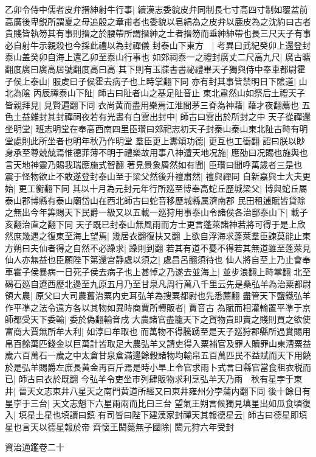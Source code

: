 乙卯令侍中儒者皮弁搢紳射牛行事|{
	續漢志委貌皮弁同制長七寸高四寸制如覆盆前高廣後卑鋭所謂夏之毋追殷之章甫者也委貌以皂絹為之皮弁以鹿皮為之沈約曰古者貴賤皆執笏其有事則搢之於腰帶所謂搢紳之士者搢笏而垂紳紳帶也長三尺天子有事必自射牛示親殺也今採此禮以為封禪儀}
封泰山下東方　|{
	考異曰武紀癸卯上還登封泰山盖癸卯自海上還乙卯至泰山行事也}
如郊祠泰一之禮封廣丈二尺高九尺|{
	廣古曠翻度廣曰廣高居號翻度高曰高}
其下則有玉牒書書祕禮畢天子獨與侍中奉車都尉霍子侯上泰山|{
	服䖍曰子侯霍去病子也上時掌翻下同}
亦有封其事皆禁明日下隂道|{
	山北為隂}
丙辰禪泰山下阯|{
	師古曰阯者山之基足阯音止}
東北肅然山如祭后土禮天子皆親拜見|{
	見賢遍翻下同}
衣尚黄而盡用樂焉江淮間茅三脊為神藉|{
	藉才夜翻薦也}
五色土益雜封其封禪祠夜若有光晝有白雲出封中|{
	師古曰雲出於所封之中}
天子從禪還坐明堂|{
	班志明堂在奉高西南四里臣瓚曰郊祀志初天子封泰山泰山東北阯古時有明堂處則此所坐者也明年秋乃作明堂}
羣臣更上夀頌功德|{
	更互也工衝翻}
詔曰朕以眇身承至尊兢兢焉惟德菲薄不明于禮樂故用事八神遭天地况施|{
	應劭曰况賜也施與也言天地神靈乃賜我瑞應施式智翻}
著見景象屑然如有聞|{
	臣瓚曰聞呼萬歲者三是也}
震于怪物欲止不敢遂登封泰山至于梁父然後升䄠肅然|{
	䄠與禪同}
自新嘉與士大夫更始|{
	更工衡翻下同}
其以十月為元封元年行所廵至博奉高蛇丘歷城梁父|{
	博與蛇丘屬泰山郡博縣有泰山廟岱山在西北師古曰蛇音移歷城縣属濟南郡}
民田租逋賦皆貸除之無出今年筭賜天下民爵一級又以五載一廵狩用事泰山令諸侯各治邸泰山下|{
	載子亥翻治直之翻下同}
天子既已封泰山無風雨而方士更言蓬萊諸神若將可得于是上欣然庶幾遇之復東至海上望焉|{
	幾居衣翻復扶又翻}
上欲自浮海求蓬萊羣臣諫莫能止東方朔曰夫仙者得之自然不必躁求|{
	躁則到翻}
若其有道不憂不得若其無道雖至蓬萊見仙人亦無益也臣願陛下第還宫静處以須之|{
	處昌呂翻須待也}
仙人將自至上乃止會奉車霍子侯暴病一日死子侯去病子也上甚悼之乃遂去並海上|{
	並步浪翻上時掌翻}
北至碣石廵自遼西歷北邊至九原五月乃至甘泉凡周行萬八千里云先是桑弘羊為治粟都尉領大農|{
	原父曰大司農舊治粟内史耳弘羊為搜粟都尉也先悉薦翻}
盡管天下鹽鐵弘羊作平凖之法令遠方各以其物如異時商賈所轉販者|{
	賈音古}
為賦而相灌輸置平凖于京師都受天下委輸|{
	委於偽翻輸音戌}
大農諸官盡籠天下之貨物貴即賣之賤則買之欲使富商大賈無所牟大利|{
	如淳曰牟取也}
而萬物不得騰踴至是天子廵狩郡縣所過賞賜用帛百餘萬匹錢金以巨萬計皆取足大農弘羊又請吏得入粟補官及罪人贖罪山東漕粟益歲六百萬石一歲之中太倉甘泉倉滿邊餘穀諸物均輸帛五百萬匹民不益賦而天下用饒於是弘羊賜爵左庶長黄金再百斤焉是時小旱上令官求雨卜式言曰縣官當食租衣税而已|{
	師古曰衣於既翻}
今弘羊令吏坐市列肆販物求利烹弘羊天乃雨　秋有星孛于東井|{
	晉天文志東井八星天之南門黄道所經又曰東井雍州分孛蒲内翻下同}
後十餘日有星孛于三台|{
	天文志魁下六星兩兩而比曰三台}
望氣王朔言候獨見填星出如瓜食頃復入|{
	填星土星也填讀曰鎮}
有司皆曰陛下建漢家封禪天其報德星云|{
	師古曰德星即填星也言天以德星報於帝}
齊懷王閎薨無子國除|{
	閎元狩六年受封}


資治通鑑卷二十

